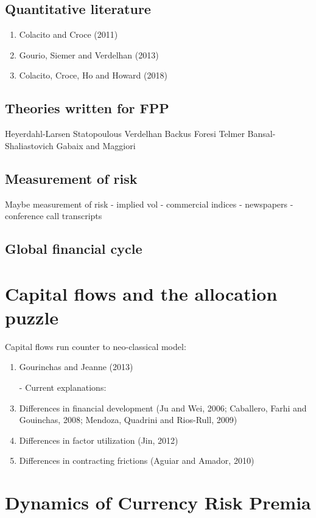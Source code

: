 \documentclass{ar-1col}
\begin{document}
\subsection{Quantitative literature}
\begin{enumerate}
\item Colacito and Croce (2011)
\item Gourio, Siemer and Verdelhan (2013)
\item Colacito, Croce, Ho and Howard (2018)
\end{enumerate}
\subsection{Theories written for FPP}
Heyerdahl-Larsen Statopoulous Verdelhan Backus Foresi Telmer
Bansal-Shaliastovich Gabaix and Maggiori
\subsection{Measurement of risk}
Maybe measurement of risk - implied vol - commercial indices -
newspapers - conference call transcripts
\subsection{Global financial cycle}

\section{Capital flows and the allocation puzzle}
Capital flows run counter to neo-classical model:
\begin{enumerate}
\item Gourinchas and Jeanne (2013)
\item[-] Current explanations:
\item Differences in financial development (Ju and Wei, 2006;
  Caballero, Farhi and Gouinchas, 2008; Mendoza, Quadrini and
  Rios-Rull, 2009)
\item Differences in factor utilization (Jin, 2012)
\item Differences in contracting frictions (Aguiar and Amador, 2010)
\end{enumerate}

\section{Dynamics of Currency Risk Premia}
\end{document}
